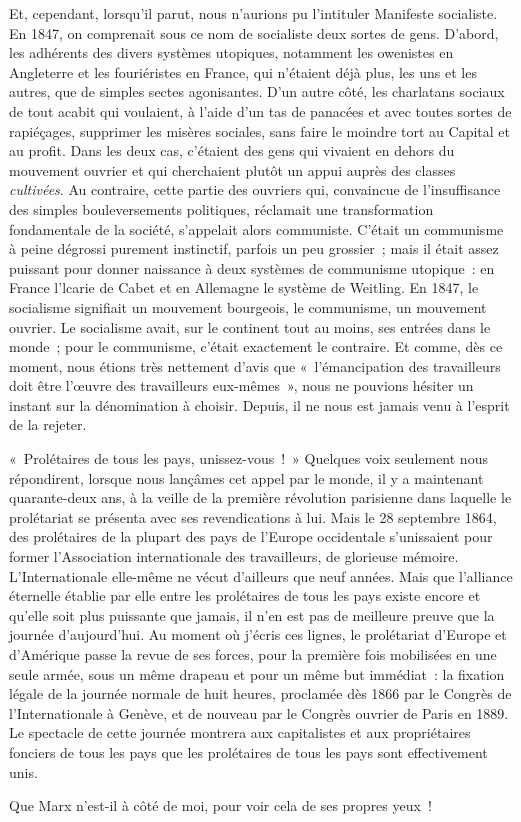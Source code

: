 \documentclass[french,twoside]{book} %
\begin{document}
Et, cependant, lorsqu’il parut, nous n’aurions pu l’intituler Manifeste socialiste. En 1847, on comprenait sous ce nom de socialiste deux sortes de gens. D'abord, les adhérents des divers systèmes utopiques, notamment les owenistes en Angleterre et les fouriéristes en France, qui n’étaient déjà plus, les uns et les autres, que de simples sectes agonisantes. D'un autre côté, les charlatans sociaux de tout acabit qui voulaient, à l’aide d’un tas de panacées et avec toutes sortes de rapiéçages, supprimer les misères sociales, sans faire le moindre tort au Capital et au profit. Dans les deux cas, c’étaient des gens qui vivaient en dehors du mouvement ouvrier et qui cherchaient plutôt un appui auprès des classes \emph{cultivées}. Au contraire, cette partie des ouvriers qui, convaincue de l’insuffisance des simples bouleversements politiques, réclamait une transformation fondamentale de la société, s’appelait alors communiste. C'était un communisme à peine dégrossi purement instinctif, parfois un peu grossier ; mais il était assez puissant pour donner naissance à deux systèmes de communisme utopique : en France l’lcarie de Cabet et en Allemagne le système de Weitling. En 1847, le socialisme signifiait un mouvement bourgeois, le communisme, un mouvement ouvrier. Le socialisme avait, sur le continent tout au moins, ses entrées dans le monde ; pour le communisme, c’était exactement le contraire. Et comme, dès ce moment, nous étions très nettement d’avis que « l’émancipation des travailleurs doit être l’œuvre des travailleurs eux-mêmes », nous ne pouvions hésiter un instant sur la dénomination à choisir. Depuis, il ne nous est jamais venu à l’esprit de la rejeter.\par
« Prolétaires de tous les pays, unissez-vous ! » Quelques voix seulement nous répondirent, lorsque nous lançâmes cet appel par le monde, il y a maintenant quarante-deux ans, à la veille de la première révolution parisienne dans laquelle le prolétariat se présenta avec ses revendications à lui. Mais le 28 septembre 1864, des prolétaires de la plupart des pays de l’Europe occidentale s’unissaient pour former l’Association internationale des travailleurs, de glorieuse mémoire. L'Internationale elle-même ne vécut d’ailleurs que neuf années. Mais que l’alliance éternelle établie par elle entre les prolétaires de tous les pays existe encore et qu’elle soit plus puissante que jamais, il n’en est pas de meilleure preuve que la journée d’aujourd’hui. Au moment où j’écris ces lignes, le prolétariat d’Europe et d’Amérique passe la revue de ses forces, pour la première fois mobilisées en une seule armée, sous un même drapeau et pour un même but immédiat : la fixation légale de la journée normale de huit heures, proclamée dès 1866 par le Congrès de l’Internationale à Genève, et de nouveau par le Congrès ouvrier de Paris en 1889. Le spectacle de cette journée montrera aux capitalistes et aux propriétaires fonciers de tous les pays que les prolétaires de tous les pays sont effectivement unis.\par
Que Marx n’est-il à côté de moi, pour voir cela de ses propres yeux !\par
\end{document}

